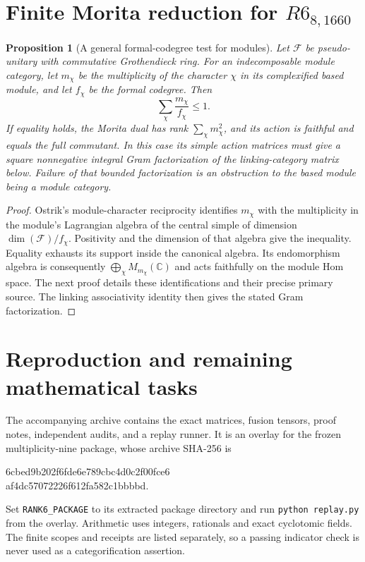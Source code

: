 \documentclass[11pt]{article}
\newtheorem{proposition}[theorem]{Proposition}
\begin{document}
\section{Finite Morita reduction for $R6_{8,1660}$}
\begin{proposition}[A general formal-codegree test for modules]
Let $\mathcal F$ be pseudo-unitary with commutative Grothendieck ring.
For an indecomposable module category, let $m_\chi$ be the multiplicity
of the character $\chi$ in its complexified based module, and let
$f_\chi$ be the formal codegree. Then
\[
 \sum_\chi\frac{m_\chi}{f_\chi}\leq1.
\]
If equality holds, the Morita dual has rank $\sum_\chi m_\chi^2$,
and its action is faithful and equals the full commutant. In this
case its simple action matrices must give a square nonnegative
integral Gram factorization of the linking-category matrix below.
Failure of that bounded factorization is an obstruction to the based
module being a module category.
\end{proposition}
\begin{proof}
Ostrik's module-character reciprocity identifies $m_\chi$ with the
multiplicity in the module's Lagrangian algebra of the central simple
of dimension $\dim(\mathcal F)/f_\chi$. Positivity and the dimension
of that algebra give the inequality. Equality exhausts its support
inside the canonical algebra. Its endomorphism algebra is consequently
$\bigoplus_\chi M_{m_\chi}(\mathbb C)$ and acts faithfully on the
module Hom space. The next proof details these identifications and
their precise primary source. The linking associativity identity then
gives the stated Gram factorization.
\end{proof}



\section{Reproduction and remaining mathematical tasks}

The accompanying archive contains the exact matrices, fusion tensors,
proof notes, independent audits, and a replay runner. It is an overlay
for the frozen multiplicity-nine package, whose archive SHA-256 is
\begin{center}\small\ttfamily
6cbed9b202f6fde6e789cbc4d0c2f00fce6\\
af4dc57072226f612fa582c1bbbbd.
\end{center}
Set \texttt{RANK6\_PACKAGE} to its extracted package directory and run
\texttt{python replay.py} from the overlay. Arithmetic uses integers,
rationals and exact cyclotomic fields. The finite scopes and receipts
are listed separately, so a passing indicator check is never used as
a categorification assertion.
\end{document}
